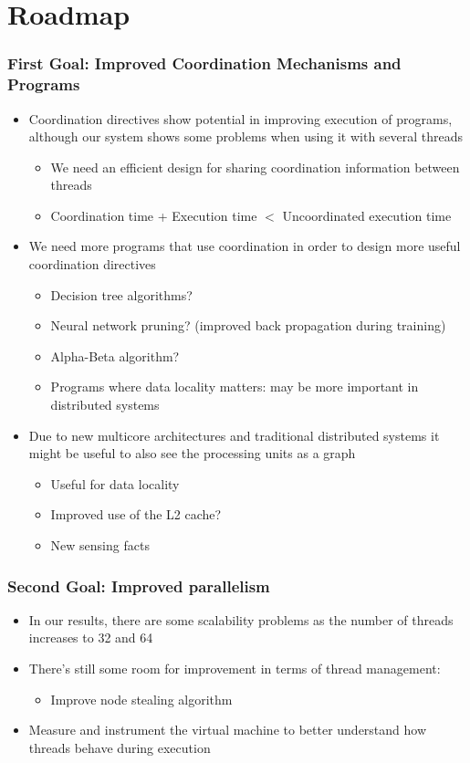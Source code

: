 \documentclass{beamer}
\begin{document}
\section{Roadmap}

\begin{frame}[fragile]
   \frametitle{First Goal: Improved Coordination Mechanisms and Programs}
   \begin{itemize}
      \item Coordination directives show potential in improving execution of programs, although our system shows some problems when using it with several threads
      \begin{itemize}
         \item We need an efficient design for sharing coordination information between threads
         \item Coordination time + Execution time $<$ Uncoordinated execution time
      \end{itemize}
      \item We need more programs that use coordination in order to design more useful coordination directives
      \begin{itemize}
         \item Decision tree algorithms?
         \item Neural network pruning? (improved back propagation during training)
         \item Alpha-Beta algorithm?
         \item Programs where data locality matters: may be more important in distributed systems
      \end{itemize}
      \item Due to new multicore architectures and traditional distributed systems it might be useful to also see the processing units as a graph
      \begin{itemize}
         \item Useful for data locality
         \item Improved use of the L2 cache?
         \item New sensing facts
      \end{itemize}
   \end{itemize}
\end{frame}

\begin{frame}[fragile]
   \frametitle{Second Goal: Improved parallelism}
   \begin{itemize}
      \item In our results, there are some scalability problems as the number of threads increases to 32 and 64
      \item There's still some room for improvement in terms of thread management:
      \begin{itemize}
         \item Improve node stealing algorithm
      \end{itemize}
      \item Measure and instrument the virtual machine to better understand how threads behave during execution
   \end{itemize}
\end{frame}
\end{document}
